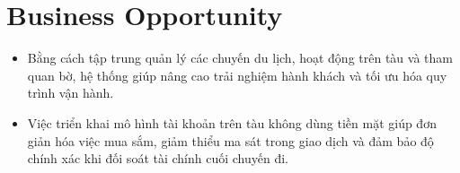 \section{Business Opportunity}
\begin{itemize}
    \item Bằng cách tập trung quản lý các chuyến du lịch, hoạt động trên tàu và tham quan bờ, hệ thống giúp nâng cao trải nghiệm hành khách và tối ưu hóa quy trình vận hành.
    \item Việc triển khai mô hình tài khoản trên tàu không dùng tiền mặt giúp đơn giản hóa việc mua sắm, giảm thiểu ma sát trong giao dịch và đảm bảo độ chính xác khi đối soát tài chính cuối chuyến đi.
\end{itemize}